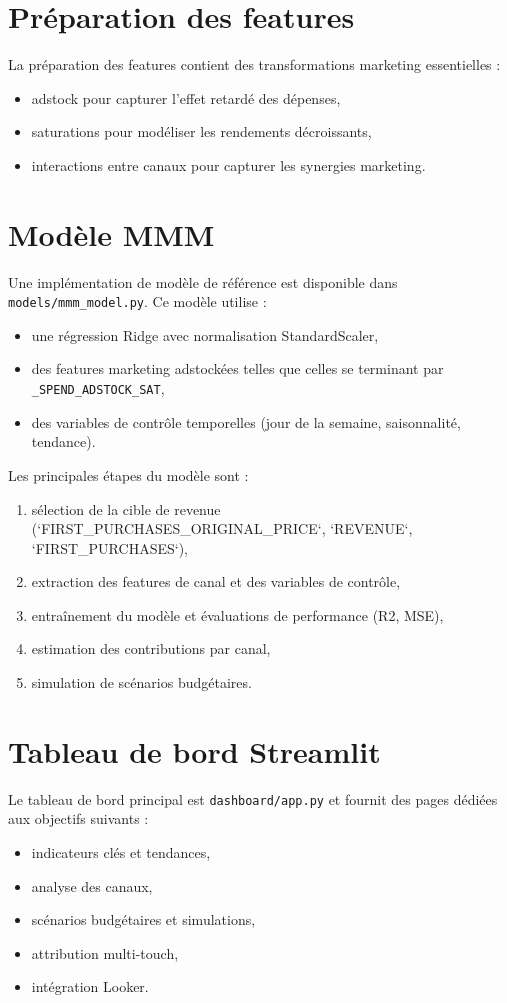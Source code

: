 \documentclass[11pt,a4paper]{article}
\begin{document}
\section{Préparation des features}
La préparation des features contient des transformations marketing essentielles :
\begin{itemize}
  \item adstock pour capturer l'effet retardé des dépenses,
  \item saturations pour modéliser les rendements décroissants,
  \item interactions entre canaux pour capturer les synergies marketing.
\end{itemize}

\section{Modèle MMM}
Une implémentation de modèle de référence est disponible dans \texttt{models/mmm_model.py}.
Ce modèle utilise :
\begin{itemize}
  \item une régression Ridge avec normalisation StandardScaler,
  \item des features marketing adstockées telles que celles se terminant par \texttt{\_SPEND\_ADSTOCK\_SAT},
  \item des variables de contrôle temporelles (jour de la semaine, saisonnalité, tendance).
\end{itemize}

Les principales étapes du modèle sont :
\begin{enumerate}
  \item sélection de la cible de revenue (`FIRST_PURCHASES_ORIGINAL_PRICE`, `REVENUE`, `FIRST_PURCHASES`),
  \item extraction des features de canal et des variables de contrôle,
  \item entraînement du modèle et évaluations de performance (R2, MSE),
  \item estimation des contributions par canal,
  \item simulation de scénarios budgétaires.
\end{enumerate}

\section{Tableau de bord Streamlit}
Le tableau de bord principal est \texttt{dashboard/app.py} et fournit des pages dédiées aux objectifs suivants :
\begin{itemize}
  \item indicateurs clés et tendances,
  \item analyse des canaux,
  \item scénarios budgétaires et simulations,
  \item attribution multi-touch,
  \item intégration Looker.
\end{itemize}
\end{document}
